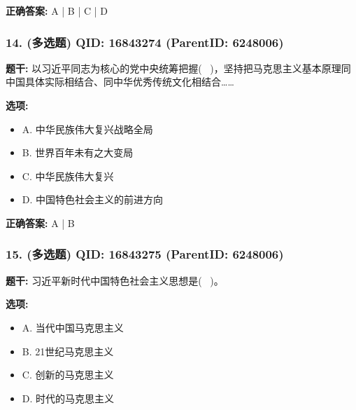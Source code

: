 \documentclass[12pt,UTF8]{ctexart}
\begin{document}
\textbf{正确答案:}
A | B | C | D

\vspace{0.3em}\hrulefill\vspace{0.7em}

\subsubsection*{14. (多选题) \small QID: 16843274 (ParentID: 6248006)}

\textbf{题干:}
以习近平同志为核心的党中央统筹把握(  )，坚持把马克思主义基本原理同中国具体实际相结合、同中华优秀传统文化相结合……



\textbf{选项:}
\begin{itemize}[leftmargin=*]

  \item A. 中华民族伟大复兴战略全局

  \item B. 世界百年未有之大变局

  \item C. 中华民族伟大复兴

  \item D. 中国特色社会主义的前进方向

\end{itemize}

\textbf{正确答案:}
A | B

\vspace{0.3em}\hrulefill\vspace{0.7em}

\subsubsection*{15. (多选题) \small QID: 16843275 (ParentID: 6248006)}

\textbf{题干:}
习近平新时代中国特色社会主义思想是(  )。



\textbf{选项:}
\begin{itemize}[leftmargin=*]

  \item A. 当代中国马克思主义

  \item B. 21世纪马克思主义

  \item C. 创新的马克思主义

  \item D. 时代的马克思主义

\end{itemize}
\end{document}
